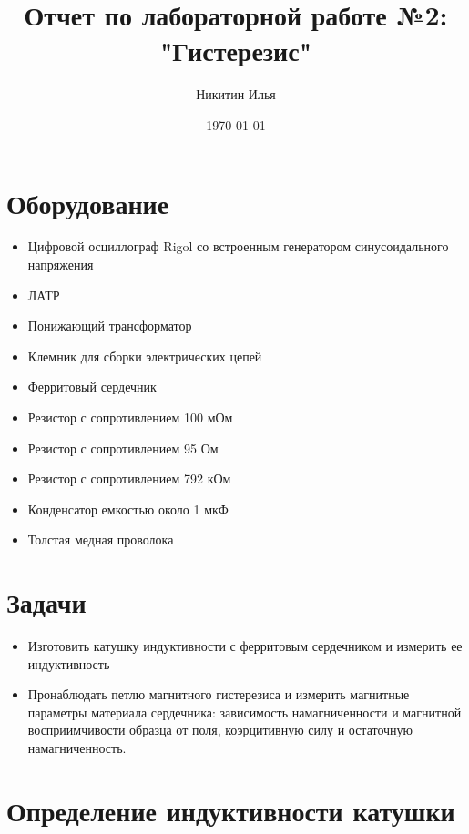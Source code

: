 \documentclass[a4paper,14pt]{extarticle}
\author{Никитин Илья}
\title{Отчет по лабораторной работе №2: "Гистерезис"}
\date{\today}
\begin{document}
	
	\maketitle
	\tableofcontents
	
	\section{Оборудование}
	\begin{itemize}
		\item Цифровой осциллограф Rigol со встроенным генератором синусоидального напряжения
		\item ЛАТР
		\item Понижающий трансформатор
		\item Клемник для сборки электрических цепей
		\item Ферритовый сердечник
		\item Резистор с сопротивлением 100 мОм
		\item Резистор с сопротивлением 95 Ом
		\item Резистор с сопротивлением 792 кОм
		\item Конденсатор емкостью около 1 мкФ
		\item Толстая медная проволока
	\end{itemize}
	\section{Задачи}
	\begin{itemize}
		\item Изготовить катушку индуктивности с ферритовым сердечником и измерить ее
		индуктивность
		\item Пронаблюдать петлю магнитного гистерезиса и измерить магнитные параметры материала сердечника: зависимость намагниченности и магнитной восприимчивости образца от поля, коэрцитивную силу и остаточную намагниченность.
	\end{itemize}
	\section{Определение индуктивности катушки}
\end{document}
